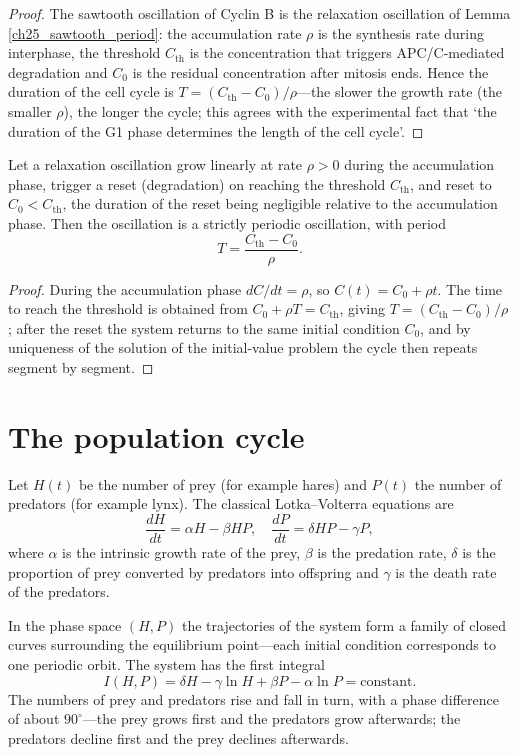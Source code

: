 \begin{proof}
The sawtooth oscillation of Cyclin B is the relaxation oscillation of Lemma \ref{ch25_sawtooth_period}: the accumulation rate $\rho$ is the synthesis rate during interphase, the threshold $C_{\text{th}}$ is the concentration that triggers APC/C-mediated degradation and $C_0$ is the residual concentration after mitosis ends. Hence the duration of the cell cycle is $T = (C_{\text{th}} - C_0)/\rho$---the slower the growth rate (the smaller $\rho$), the longer the cycle; this agrees with the experimental fact that `the duration of the G1 phase determines the length of the cell cycle'.
\end{proof}

\begin{lemma}\label{ch25_sawtooth_period}
Let a relaxation oscillation grow linearly at rate $\rho > 0$ during the accumulation phase, trigger a reset (degradation) on reaching the threshold $C_{\text{th}}$, and reset to $C_0 < C_{\text{th}}$, the duration of the reset being negligible relative to the accumulation phase. Then the oscillation is a strictly periodic oscillation, with period
\[
T = \frac{C_{\text{th}} - C_0}{\rho}.
\]
\end{lemma}

\begin{proof}
During the accumulation phase $dC/dt = \rho$, so $C(t) = C_0 + \rho t$. The time to reach the threshold is obtained from $C_0 + \rho T = C_{\text{th}}$, giving $T = (C_{\text{th}} - C_0)/\rho$; after the reset the system returns to the same initial condition $C_0$, and by uniqueness of the solution of the initial-value problem the cycle then repeats segment by segment.
\end{proof}

\section{The population cycle}

\begin{definition}\label{def:lotka_volterra}
Let $H(t)$ be the number of prey (for example hares) and $P(t)$ the number of predators (for example lynx). The classical Lotka--Volterra equations are
\[
\frac{dH}{dt} = \alpha H - \beta H P, \quad \frac{dP}{dt} = \delta H P - \gamma P,
\]
where $\alpha$ is the intrinsic growth rate of the prey, $\beta$ is the predation rate, $\delta$ is the proportion of prey converted by predators into offspring and $\gamma$ is the death rate of the predators.

In the phase space $(H, P)$ the trajectories of the system form a family of closed curves surrounding the equilibrium point---each initial condition corresponds to one periodic orbit. The system has the first integral
\[
I(H, P) = \delta H - \gamma \ln H + \beta P - \alpha \ln P = \text{constant}.
\]
The numbers of prey and predators rise and fall in turn, with a phase difference of about $90^\circ$---the prey grows first and the predators grow afterwards; the predators decline first and the prey declines afterwards.
\end{definition}

